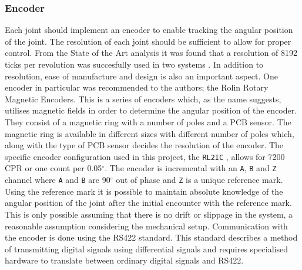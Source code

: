 \subsubsection{Encoder} %
\label{ssub:encoder}
Each joint should implement an encoder to enable tracking the angular position of the joint.
The resolution of each joint should be sufficient to allow for proper control.
From the State of the Art analysis it was found that a resolution of 8192 ticks per revolution was succesfully used in two systems \cite{doubleinvertpendulum} \cite{tripleinvertpendulum}.
In addition to resolution, ease of manufacture and design is also an important aspect.
One encoder in particular was recommended to the authors; the Rolin Rotary Magnetic Encoders.
This is a series of encoders which, as the name suggests, utilises magnetic fields in order to determine the angular position of the encoder.
They consist of a magnetic ring with a number of poles and a PCB sensor.
The magnetic ring is available in different sizes with different number of poles which, along with the type of PCB sensor decides the resolution of the encoder.
The specific encoder configuration used in this project, the \texttt{RL2IC} \cite{RLC2IC}, allows for 7200 CPR or one count per 0.05$^\circ$.
The encoder is incremental with an \texttt{A}, \texttt{B} and \texttt{Z} channel where \texttt{A} and \texttt{B} are 90$^\circ$ out of phase and \texttt{Z} is a unique reference mark.
Using the reference mark it is possible to maintain absolute knowledge of the angular position of the joint after the initial encounter with the reference mark.
This is only possible assuming that there is no drift or slippage in the system, a reasonable assumption considering the mechanical setup.
Communication with the encoder is done using the RS422 standard.
This standard describes a method of transmitting digital signals using differential signals and requires specialised hardware to translate between ordinary digital signals and RS422.

